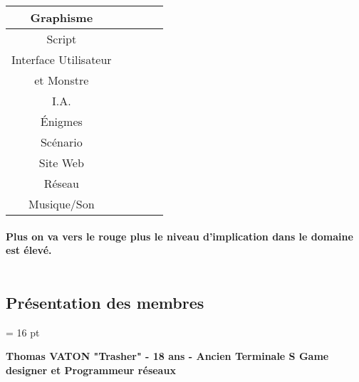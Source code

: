 \documentclass[12pt,a4paper]{article}
\begin{document}
\begin{center}
\begin{tabular}{|c|c|c|c|c|}
 \cellcolor{lightgray}Graphisme & \cellcolor{red} &  &  & \cellcolor{yellow} \\ 
 \hline 
 \cellcolor{lightgray}Script &  & \cellcolor{yellow} & \cellcolor{red} & \cellcolor{yellow} \\ 
 \hline 
  \cellcolor{lightgray} Interface Utilisateur & \cellcolor{yellow}  &  &  & \cellcolor{orange} \\ \cellcolor{lightgray} et Monstre & \cellcolor{yellow}  &  &  & \cellcolor{orange} \\ 
 \hline 
  \cellcolor{lightgray}I.A. &  &  & \cellcolor{red} &  \\ 
 \hline 
  \cellcolor{lightgray}Énigmes & \cellcolor{orange} & \cellcolor{orange} &  &  \\ 
 \hline 
 \cellcolor{lightgray}Scénario & \cellcolor{yellow} & \cellcolor{yellow} & \cellcolor{yellow} & \cellcolor{yellow} \\ 
 \hline 
 \cellcolor{lightgray}Site Web &  & \cellcolor{red} &  &  \\ 
 \hline 
 \cellcolor{lightgray} Réseau & \cellcolor{orange} &  & \cellcolor{yellow}  & \cellcolor{red}  \\ 
 \hline 
 \cellcolor{lightgray}Musique/Son &  & \cellcolor{yellow} &  & \cellcolor{yellow} \\ 
 \hline 
 \end{tabular}
\paragraph{Plus on va vers le rouge plus le niveau d'implication dans le domaine est élevé.} 
\paragraph{}
 \begin{tabular}{|c|c|c|c|}
 \hline 
\cellcolor{white} & \cellcolor{yellow} & \cellcolor{orange} & \cellcolor{red} \\ 
 \hline 
 \end{tabular}

\end{center}
\newpage
\subsection{Présentation des membres}
\baselineskip = 16 pt
\begin{center}
\textbf{Thomas VATON "Trasher" - 18 ans - Ancien Terminale S\newline
Game designer et Programmeur réseaux}
\end{center}
\end{document}
